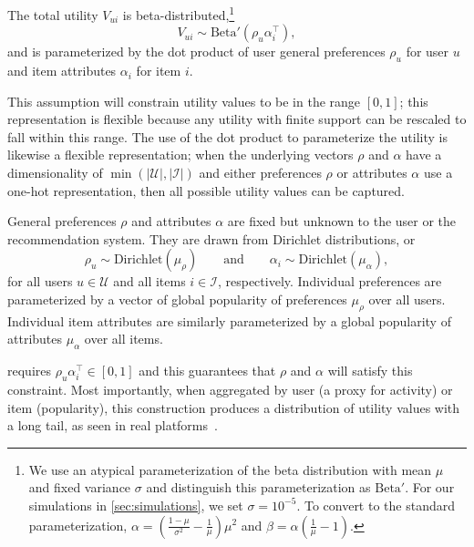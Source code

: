 \documentclass[sigconf]{acmart}
\begin{document}
\begin{assumption}
The total utility $V_{ui}$ is beta-distributed,\footnote{We use an atypical parameterization of the beta distribution with mean $\mu$ and fixed variance $\sigma$ and distinguish this parameterization as $\mbox{Beta}'$. For our simulations in \cref{sec:simulations}, we set $\sigma=10^{-5}$.  To convert to the standard parameterization, $\alpha=\left(\frac{1-\mu}{\sigma^2} - \frac{1}{\mu}\right)\mu^2$ and $\beta=\alpha\left(\frac{1}{\mu} - 1\right)$.} 
\begin{equation}
	V_{ui} \sim \mbox{Beta}'(\rho_{u} \alpha_i^\top),
\end{equation}
and is parameterized by the dot product of user general preferences $\rho_u$ for user $u$ and item attributes $\alpha_i$ for item $i$.
\label{as:utility}
\end{assumption}

\vspace{-3px}
This assumption will constrain utility values to be in the range $[0,1]$; this representation is flexible because any utility with finite support can be rescaled to fall within this range.  The use of the dot product to parameterize the utility is likewise a flexible representation; when the underlying vectors $\rho$ and $\alpha$ have a dimensionality of $\min(\vert\mathcal{U}\vert, \vert\mathcal{I}\vert)$ and either preferences $\rho$ or attributes $\alpha$ use a one-hot representation, then all possible utility values can be captured.

\begin{assumption}
General preferences $\rho$ and attributes $\alpha$ are fixed but unknown to the user or the recommendation system.  They are drawn from Dirichlet distributions, or 
\begin{equation}
\rho_u \sim \mbox{Dirichlet}(\mu_\rho)
\qquad
\mbox{and}
\qquad
\alpha_i \sim \mbox{Dirichlet}(\mu_\alpha),
\label{eq:pref}
\end{equation}
for all users $u \in \mathcal{U}$ and all items $i \in \mathcal{I}$, respectively.  Individual preferences are parameterized by a vector of global popularity of preferences $\mu_\rho$ over all users.  Individual item attributes are similarly parameterized by a global popularity of attributes $\mu_\alpha$ over all items.
\label{as:prefs}
\end{assumption}

\vspace{-3px}
 requires $\rho_{u} \alpha_i^\top \in [0,1]$ and this guarantees that $\rho$ and $\alpha$ will satisfy this constraint.  
Most importantly, when aggregated by user (a proxy for activity) or item (popularity), this construction produces a distribution of utility values with a long tail, as seen in real platforms~\citep{celma2010long}.
\end{document}

